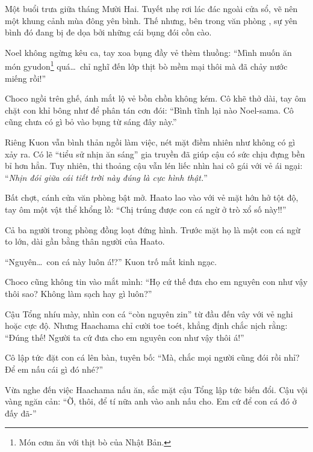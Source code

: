 \documentclass[../main.tex]{subfiles}
\begin{document}

Một buổi trưa giữa tháng Mười Hai. Tuyết nhẹ rơi lác đác ngoài cửa sổ, vẽ nên một khung cảnh mùa đông yên bình. Thế nhưng, bên trong văn phòng \hll, sự yên bình đó đang bị đe dọa bởi những cái bụng đói cồn cào.


Noel không ngừng kêu ca, tay xoa bụng đầy vẻ thèm thuồng: ``Mình muốn ăn món gyudon\footnote{Món cơm ăn với thịt bò của Nhật Bản.} quá\dots\ chỉ nghĩ đến lớp thịt bò mềm mại thôi mà đã chảy nước miếng rồi!''

Choco ngồi trên ghế, ánh mắt lộ vẻ bồn chồn không kém. Cô khẽ thở dài, tay ôm chặt con khỉ bông như để phân tán cơn đói: ``Bình tĩnh lại nào Noel-sama. Cô cũng chưa có gì bỏ vào bụng từ sáng đây này.''

Riêng Kuon vẫn bình thản ngồi làm việc, nét mặt điềm nhiên như không có gì xảy ra. Có lẽ ``tiểu sử nhịn ăn sáng'' gia truyền đã giúp cậu có sức chịu đựng bền bỉ hơn hẳn. Tuy nhiên, thi thoảng cậu vẫn lén liếc nhìn hai cô gái với vẻ ái ngại: ``\textit{Nhịn đói giữa cái tiết trời này đúng là cực hình thật.}''

Bất chợt, cánh cửa văn phòng bật mở. Haato lao vào với vẻ mặt hớn hở tột độ, tay ôm một vật thể khổng lồ: ``Chị trúng được con cá ngừ ở trò xổ số này!!''


Cả ba người trong phòng đồng loạt đứng hình. Trước mặt họ là một con cá ngừ to lớn, dài gần bằng thân người của Haato.

``Nguyên\dots\ con cá này luôn á!?'' Kuon trố mắt kinh ngạc.

Choco cũng không tin vào mắt mình: ``Họ cứ thế đưa cho em nguyên con như vậy thôi sao? Không làm sạch hay gì luôn?''

Cậu Tổng nhíu mày, nhìn con cá ``còn nguyên zin'' từ đầu đến vây với vẻ nghi hoặc cực độ. Nhưng Haachama chỉ cười toe toét, khẳng định chắc nịch rằng: ``Đúng thế! Người ta cứ đưa cho em nguyên con như vậy thôi á!''

Cô lập tức đặt con cá lên bàn, tuyên bố: ``Mà, chắc mọi người cũng đói rồi nhỉ? Để em nấu cái gì đó nhé?''

Vừa nghe đến việc Haachama nấu ăn, sắc mặt cậu Tổng lập tức biến đổi. Cậu vội vàng ngăn cản: ``Ờ, thôi, để tí nữa anh vào anh nấu cho. Em cứ để con cá đó ở đấy đã-''
\end{document}

